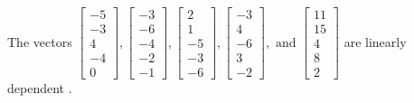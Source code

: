 \begin{exercise}
\begin{exerciseStatement}
  \end{exerciseStatement}
  \begin{exerciseAnswer}
   The vectors \(\left[\begin{array}{r}
-5 \\
-3 \\
4 \\
-4 \\
0
\end{array}\right] , \left[\begin{array}{r}
-3 \\
-6 \\
-4 \\
-2 \\
-1
\end{array}\right] , \left[\begin{array}{r}
2 \\
1 \\
-5 \\
-3 \\
-6
\end{array}\right] , \left[\begin{array}{r}
-3 \\
4 \\
-6 \\
3 \\
-2
\end{array}\right] , \text{ and } \left[\begin{array}{r}
11 \\
15 \\
4 \\
8 \\
2
\end{array}\right]\) are 
  	 linearly dependent  .
  


  \end{exerciseAnswer}
\end{exercise}